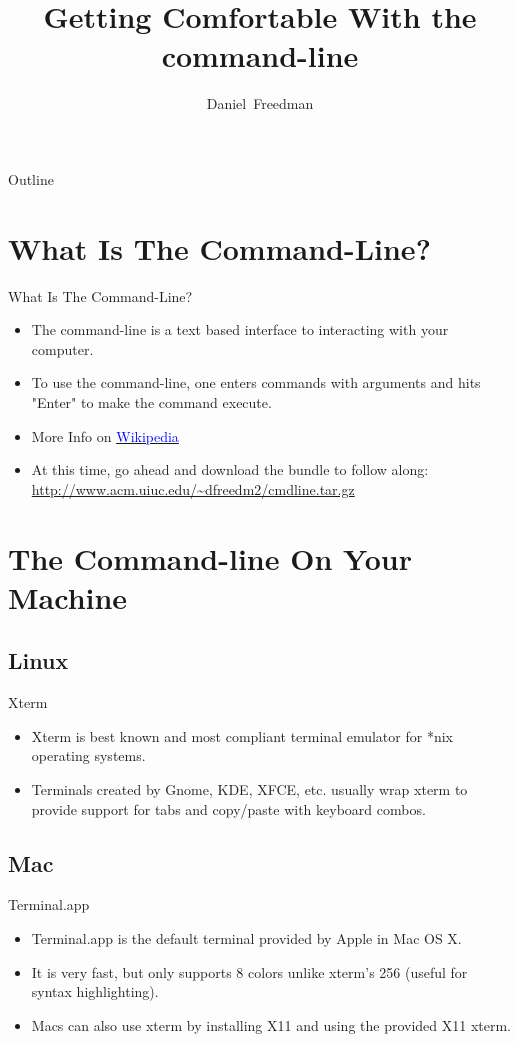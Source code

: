 \documentclass[10pt]{beamer}
\title[Getting Comfortable With the command-line]
{Getting Comfortable With the command-line}
\author[ACM Student Lecture Series]{Daniel~Freedman}
\date[September 14th, 2010]
\begin{document}
\begin{frame}
  \titlepage
\end{frame}

\begin{frame}[shrink]{Outline}
  \tableofcontents
\end{frame}

\section{What Is The Command-Line?}
\begin{frame}{What Is The Command-Line?}
  \begin{itemize}[<+->]
  \item The command-line is a text based interface to interacting with your computer.
  \item To use the command-line, one enters commands with arguments and hits "Enter" to make the command execute.
  \item More Info on \href{http://en.wikipedia.org/wiki/Command-line\_interface}{\textcolor{blue}{Wikipedia}}
  \item At this time, go ahead and download the bundle to follow along: \url{http://www.acm.uiuc.edu/~dfreedm2/cmdline.tar.gz}
  \end{itemize}
\end{frame}

\section{The Command-line On Your Machine}

\subsection{Linux}
\begin{frame}{Xterm}
\begin{itemize}[<+->]
\item Xterm is best known and most compliant terminal emulator for *nix operating systems.
\item Terminals created by Gnome, KDE, XFCE, etc. usually wrap xterm to provide support for tabs and copy/paste with keyboard combos.
\end{itemize}
\end{frame}

\subsection{Mac}
\begin{frame}{Terminal.app}
\begin{itemize}[<+->]
\item Terminal.app is the default terminal provided by Apple in Mac OS X.
\item It is very fast, but only supports 8 colors unlike xterm's 256 (useful for syntax highlighting).
\item Macs can also use xterm by installing X11 and using the provided X11 xterm.
\end{itemize}
\end{frame}
\end{document}
